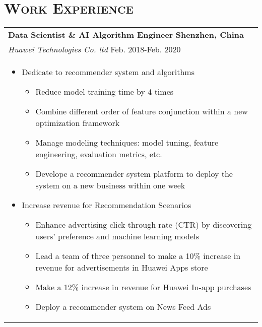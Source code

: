 \documentclass[a4paper,11pt]{article} %
\begin{document}
\section{\Large\bf\textsc{Work Experience}}
\begin{tabular}{p{18.5cm}}

{\bf{Data Scientist \& AI Algorithm Engineer}} \hfill \bf{Shenzhen, China}\\
{\it Huawei Technologies Co. ltd} \hfill  Feb. 2018-Feb. 2020\\%
\begin{itemize}
\vspace{-3mm}
\item Dedicate to recommender system and algorithms
\begin{itemize}
\item Reduce model training time by 4 times
\item Combine different order of feature conjunction within a new optimization framework 
\item Manage modeling techniques: model tuning, feature engineering, evaluation metrics, etc.
\item Develope a recommender system platform to deploy the system on a new business within one week
\end{itemize}
\item Increase revenue for Recommendation Scenarios 
\begin{itemize}
\item Enhance advertising click-through rate (CTR) by discovering users’ preference and machine learning models 
\item Lead a team of three personnel to make a 10\% increase in revenue for advertisements in Huawei Apps store 
\item Make a 12\% increase in revenue for Huawei In-app purchases
\item Deploy a recommender system on News Feed Ads
\end{itemize}
\end{itemize}
\end{tabular}
\vspace*{-\baselineskip}
\end{document}
